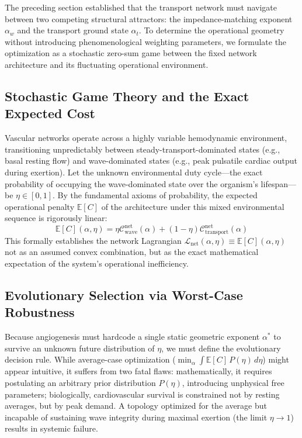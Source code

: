 \documentclass[11pt,a4paper]{article}
\theoremstyle{remark}
\begin{document}
The preceding section established that the transport network must navigate
between two competing structural attractors: the impedance-matching exponent
$\alpha_w$ and the transport ground state $\alpha_t$. To determine the
operational geometry without introducing phenomenological weighting parameters,
we formulate the optimization as a stochastic zero-sum game between the fixed
network architecture and its fluctuating operational environment.

\subsection{Stochastic Game Theory and the Exact Expected Cost}
Vascular networks operate across a highly variable hemodynamic environment,
transitioning unpredictably between steady-transport-dominated states (e.g.,
basal resting flow) and wave-dominated states (e.g., peak pulsatile cardiac
output during exertion). Let the unknown environmental duty cycle---the exact
probability of occupying the wave-dominated state over the organism's
lifespan---be $\eta \in [0,1]$. By the fundamental axioms of probability, the
expected operational penalty $\mathbb{E}[C]$ of the architecture under this
mixed environmental sequence is rigorously linear:
\begin{equation}
  \mathbb{E}[C](\alpha, \eta) = \eta \mathcal{C}_{\mathrm{wave}}^{\mathrm{net}}(\alpha) + (1-\eta) \mathcal{C}_{\mathrm{transport}}^{\mathrm{net}}(\alpha)
\end{equation}
This formally establishes the network Lagrangian
$\mathcal{L}_{\mathrm{net}}(\alpha, \eta) \equiv \mathbb{E}[C](\alpha, \eta)$
not as an assumed convex combination, but as the exact mathematical expectation
of the system's operational inefficiency.

\subsection{Evolutionary Selection via Worst-Case Robustness}
Because angiogenesis must hardcode a single static geometric exponent $\alpha^*$
to survive an unknown future distribution of $\eta$, we must define the
evolutionary decision rule. While average-case optimization ($\min_\alpha \int
\mathbb{E}[C] \, P(\eta) \, d\eta$) might appear intuitive, it suffers from two
fatal flaws: mathematically, it requires postulating an arbitrary prior
distribution $P(\eta)$, introducing unphysical free parameters; biologically,
cardiovascular survival is constrained not by resting averages, but by peak
demand. A topology optimized for the average but incapable of sustaining wave
integrity during maximal exertion (the limit $\eta \to 1$) results in systemic
failure.
\end{document}
